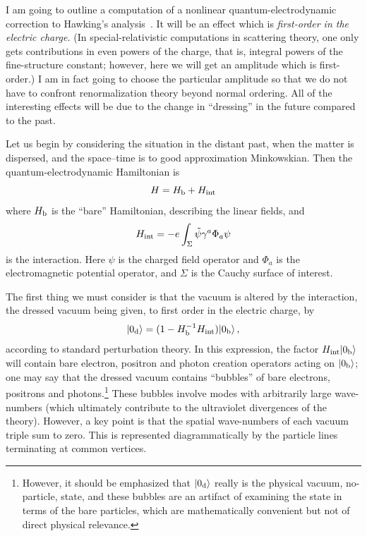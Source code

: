 \documentclass[12pt]{article}
\begin{document}
I am going to outline a computation of a nonlinear quantum-electrodynamic correction to Hawking's analysis~\citep{Helfer:2005wy,Helfer:2005wz}.  It will be an effect which is 
{\em first-order in the electric charge.}  (In special-relativistic computations in scattering theory, one only gets contributions in even powers of the charge, that is, integral powers of the fine-structure constant; however, here we will get an amplitude which is first-order.)  I am in fact going to choose the particular amplitude so that we do not have to confront renormalization theory beyond normal ordering.  All of the interesting effects will be due to the change in ``dressing'' in the future compared to the past.

Let us begin by considering the situation in the distant past, when the matter is dispersed, and the space--time is to good approximation Minkowskian.  Then the quantum-electrodynamic Hamiltonian is
\begin{equation}
H=H_{\rm b}+H_{\rm int}
\end{equation}
where $H_{\rm b}$ is the ``bare'' Hamiltonian, describing the linear fields, and
\begin{equation}
  H_{\rm int}=-e\int _\Sigma \tilde\psi \gamma ^a\Phi _a\psi
\end{equation} 
is the interaction.  Here $\psi$ is the charged field operator and $\Phi _a$ is the electromagnetic potential operator, and $\Sigma$ is the Cauchy surface of interest.

The first thing we must consider is that the vacuum is altered by the interaction, the dressed vacuum being given, to first order in the electric charge, by
\begin{equation}
 |0_{\rm d}\rangle =(1-H_{\rm b}^{-1}H_{\rm int})|0_{\rm b}\rangle\, ,
\end{equation}
according to standard perturbation theory.  In this expression, the factor $H_{\rm int}|0_{\rm b}\rangle$ will contain bare electron, positron and photon creation operators acting on $|0_{\rm b}\rangle$; one may say that the dressed vacuum contains ``bubbles'' of bare electrons, positrons and photons.\footnote{
However, it should be emphasized that $|0_{\rm d}\rangle$ really is the physical vacuum, no-particle, state, and these bubbles are an artifact of examining the state in terms of the bare particles, which are mathematically convenient but not of direct physical relevance.}
These bubbles involve modes with arbitrarily large wave-numbers (which ultimately contribute to the ultraviolet divergences of the theory).  However, a key point is that the spatial wave-numbers of each vacuum triple sum to zero.  
This is represented diagrammatically by the particle lines terminating at common vertices.
\end{document}
